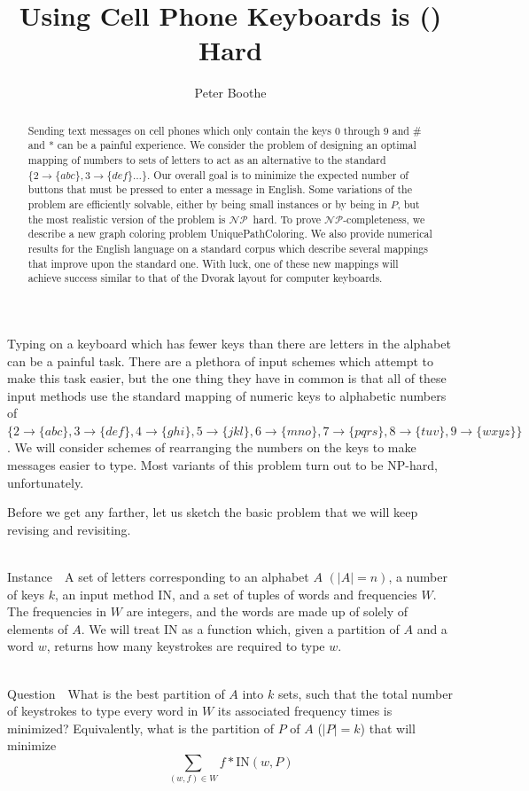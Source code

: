 \documentclass[runningheads]{llncs}
\title{Using Cell Phone Keyboards is (\NP) Hard}
\author{Peter Boothe}
\institute{Manhattan College\\
\email{peter.boothe@manhattan.edu}
}
\newcommand{\NP}{\ensuremath{\mathcal{NP}}}
\newcommand{\Instance}{{\sc Instance~}}
\newcommand{\Question}{~\\
{\sc Question~}}
\begin{document}
\maketitle

\begin{abstract}
Sending text messages on cell phones which only contain the keys 0 through 9
and \# and * can be a painful experience.  We consider the problem of designing
an optimal mapping of numbers to sets of letters to act as an alternative to
the standard $\{2\to\{abc\}, 3\to\{def\}\ldots\}$.  Our overall goal is to
minimize the expected number of buttons that must be pressed to enter a message
in English.  Some variations of the problem are efficiently solvable, either by
being small instances or by being in \ensuremath{P}, but the most realistic
version of the problem is \NP\ hard.  To prove \NP-completeness, we describe a
new graph coloring problem {\sc UniquePathColoring}.  We also provide numerical
results for the English language on a standard corpus which describe several
mappings that improve upon the standard one.  With luck, one of these new
mappings will achieve success similar to that of the Dvorak layout for computer
keyboards.
\end{abstract}

Typing on a keyboard which has fewer keys than there are letters in the
alphabet can be a painful task.  There are a plethora of input schemes which
attempt to make this task easier, but the one thing they have in common is
that all of these input methods use the standard mapping of numeric keys to
alphabetic numbers of 
$\{2\to\{abc\},
         3\to\{def\}, 4\to\{ghi\}, 5\to\{jkl\}, 6\to\{mno\}, 7\to\{pqrs\},
         8\to\{tuv\}, 9\to\{wxyz\}\}$.
We will consider schemes of rearranging the numbers on the keys to
make messages easier to type.  Most variants of this problem turn out to be
NP-hard, unfortunately.

Before we get any farther, let us sketch the basic problem that we will keep
revising and revisiting.  \begin{prob}[{\sc
MinimumKeystrokes}]~\\ \Instance\ A set of letters corresponding to an alphabet
$A$ $(|A| = n)$, a number of keys $k$, an input method $\mathrm{IN}$, and a set
of tuples of words and frequencies $W$.  The frequencies in $W$ are integers,
and the words are made up of solely of elements of $A$.  We will treat $\mathrm{IN}$ as
a function which, given a partition of $A$ and a word $w$, returns how many
keystrokes are required to type $w$.

\Question\ What is the best partition of $A$ into $k$ sets, such that the
total number of keystrokes to type every word in $W$ its associated frequency
times is minimized?  Equivalently, what is the partition of $P$ of $A$ ($|P| = k$) that
will minimize
$$\sum_{(w,f)\in W} f*\mathrm{IN}(w,P)$$
\label{probtemplate}
\end{prob}
\end{document}
